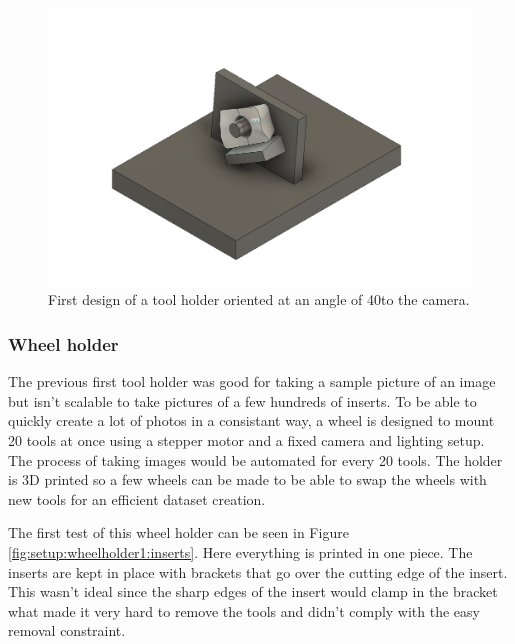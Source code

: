 	\begin{figure}[hbtp]
	\centering
	\includegraphics[scale=0.2]{fig/Camera_setup/Tool_Holder/simpeleHouder_attaached.png}
	\caption{First design of a tool holder oriented at an angle of 40\textdegree to the camera.}
	\end{figure}
	

	\subsubsection{Wheel holder}
	The previous first tool holder was good for taking a sample picture of an image but isn't scalable to take pictures of a few hundreds of inserts.
	To be able to quickly create a lot of photos in a consistant way, a wheel is designed to mount 20 tools at once using a stepper motor and a fixed camera and lighting setup. The process of taking images would be automated for every 20 tools. The holder is 3D printed so a few wheels can be made to be able to swap the wheels with new tools for an efficient dataset creation.
	
		The first test of this wheel holder can be seen in Figure \ref{fig:setup:wheelholder1:inserts}. Here everything is printed in one piece. The inserts are kept in place with brackets that go over the cutting edge of the insert. This wasn't ideal since the sharp edges of the insert would clamp in the bracket what made it very hard to remove the tools and didn't comply with the easy removal constraint. 
		
